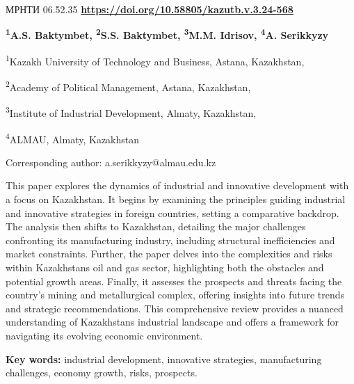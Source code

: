 \newpage
МРНТИ 06.52.35
\hfill {\bfseries \href{https://doi.org/10.58805/kazutb.v.3.24-568}{https://doi.org/10.58805/kazutb.v.3.24-568}}


\begin{center}
{\bfseries \textsuperscript{1}A.S. Baktymbet, \textsuperscript{2}S.S.
Baktymbet, \textsuperscript{3}M.M. Idrisov, \textsuperscript{4}A.
Serikkyzy\envelope}

\textsuperscript{1}Kazakh University of Technology and Business, Astana,
Kazakhstan,

\textsuperscript{2}Academy of Political Management, Astana, Kazakhstan,

\textsuperscript{3}Institute of Industrial Development, Almaty,
Kazakhstan,

\textsuperscript{4}ALMAU, Almaty, Kazakhstan
\end{center}

\envelope Corresponding author:
a.serikkyzy@almau.edu.kz

This paper explores the dynamics of industrial and innovative
development with a focus on Kazakhstan. It begins by examining the
principles guiding industrial and innovative strategies in foreign
countries, setting a comparative backdrop. The analysis then shifts to
Kazakhstan, detailing the major challenges confronting its manufacturing
industry, including structural inefficiencies and market constraints.
Further, the paper delves into the complexities and risks within
Kazakhstan\textquotesingle s oil and gas sector, highlighting both the
obstacles and potential growth areas. Finally, it assesses the prospects
and threats facing the country's mining and metallurgical complex,
offering insights into future trends and strategic recommendations. This
comprehensive review provides a nuanced understanding of
Kazakhstan\textquotesingle s industrial landscape and offers a framework
for navigating its evolving economic environment.

{\bfseries Key words:} industrial development, innovative strategies,
manufacturing challenges, economy growth, risks, prospects.


